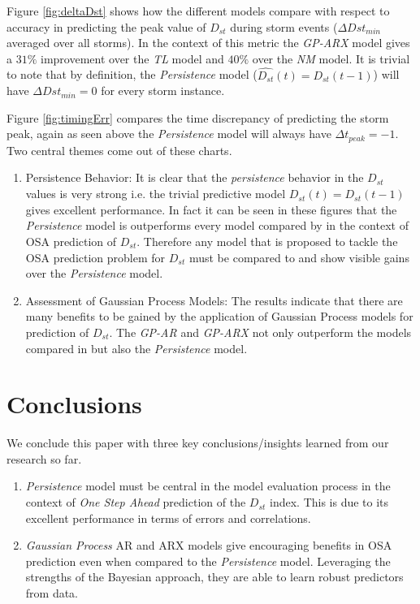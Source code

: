\documentclass[referee,a4paper,12pt,traditabstract]{swsc}
\begin{document}
\begin{linenumbers}
Figure \ref{fig:deltaDst} shows how the different models compare with respect to accuracy in predicting the peak value of $D_{st}$ during storm events ($\Delta Dst_{min}$ averaged over all storms). In the context of this metric the \emph{GP-ARX} model gives a $31\%$ improvement over the \emph{TL} model and $40\%$ over the \emph{NM} model. It is trivial to note that by definition, the \emph{Persistence} model ($\hat{D_{st}}(t) = D_{st}(t-1)$) will have $\Delta Dst_{min} = 0$ for every storm instance.

Figure \ref{fig:timingErr} compares the time discrepancy of predicting the storm peak, again as seen above the \emph{Persistence} model will always have $\Delta t_{peak} = -1$. Two central themes come out of these charts.

\begin{enumerate}
    \item Persistence Behavior: It is clear that the \emph{persistence} behavior in the $D_{st}$ values is very strong i.e. the trivial predictive model $\hat{D_{st}}(t) = D_{st}(t-1)$ gives excellent performance. In fact it can be seen in these figures that the \emph{Persistence} model is outperforms every model compared by \citet{Ji2012} in the context of OSA prediction of $D_{st}$. Therefore any model that is proposed to tackle the OSA prediction problem for $D_{st}$ must be compared to and show visible gains over the \emph{Persistence} model.
    \item Assessment of Gaussian Process Models: The results indicate that there are many benefits to be gained by the application of Gaussian Process models for prediction of $D_{st}$. The \emph{GP-AR} and \emph{GP-ARX} not only outperform the models compared in \citet{Ji2012} but also the \emph{Persistence} model. 
\end{enumerate}

  
\section{Conclusions}

We conclude this paper with three key conclusions/insights learned from our research so far.
   \begin{enumerate}
      \item \emph{Persistence} model must be central in the model evaluation process in the context of \emph{One Step Ahead} prediction of the $D_{st}$ index. This is due to its excellent performance in terms of errors and correlations. 
      \item \emph{Gaussian Process} AR and ARX models give encouraging benefits in OSA prediction even when compared to the \emph{Persistence} model. Leveraging the strengths of the Bayesian approach, they are able to learn robust predictors from data. 
      

\end{enumerate}
\end{linenumbers}
\end{document}
